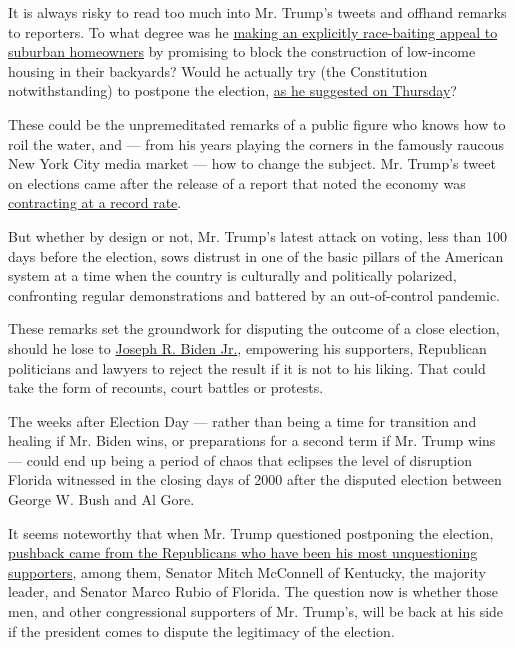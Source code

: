 It is always risky to read too much into Mr. Trump's tweets and offhand
remarks to reporters. To what degree was he
\href{https://www.nytimes.com/2020/07/29/us/politics/trump-suburbs-housing-white-voters.html}{making
an explicitly race-baiting appeal to suburban homeowners} by promising
to block the construction of low-income housing in their backyards?
Would he actually try (the Constitution notwithstanding) to postpone the
election,
\href{https://www.nytimes.com/2020/07/30/us/politics/trump-delay-2020-election.html}{as
he suggested on Thursday}?

These could be the unpremeditated remarks of a public figure who knows
how to roil the water, and --- from his years playing the corners in the
famously raucous New York City media market --- how to change the
subject. Mr. Trump's tweet on elections came after the release of a
report that noted the economy was
\href{https://www.nytimes.com/2020/07/30/business/economy/q2-gdp-coronavirus-economy.html}{contracting
at a record rate}.

But whether by design or not, Mr. Trump's latest attack on voting, less
than 100 days before the election, sows distrust in one of the basic
pillars of the American system at a time when the country is culturally
and politically polarized, confronting regular demonstrations and
battered by an out-of-control pandemic.

These remarks set the groundwork for disputing the outcome of a close
election, should he lose to
\href{https://www.nytimes.com/interactive/2020/us/elections/joe-biden.html}{Joseph
R. Biden Jr.}, empowering his supporters, Republican politicians and
lawyers to reject the result if it is not to his liking. That could take
the form of recounts, court battles or protests.

The weeks after Election Day --- rather than being a time for transition
and healing if Mr. Biden wins, or preparations for a second term if Mr.
Trump wins --- could end up being a period of chaos that eclipses the
level of disruption Florida witnessed in the closing days of 2000 after
the disputed election between George W. Bush and Al Gore.

It seems noteworthy that when Mr. Trump questioned postponing the
election,
\href{https://www.nytimes.com/2020/07/30/us/politics/trump-delay-2020-election.html}{pushback
came from the Republicans who have been his most unquestioning
supporters}, among them, Senator Mitch McConnell of Kentucky, the
majority leader, and Senator Marco Rubio of Florida. The question now is
whether those men, and other congressional supporters of Mr. Trump's,
will be back at his side if the president comes to dispute the
legitimacy of the election.

